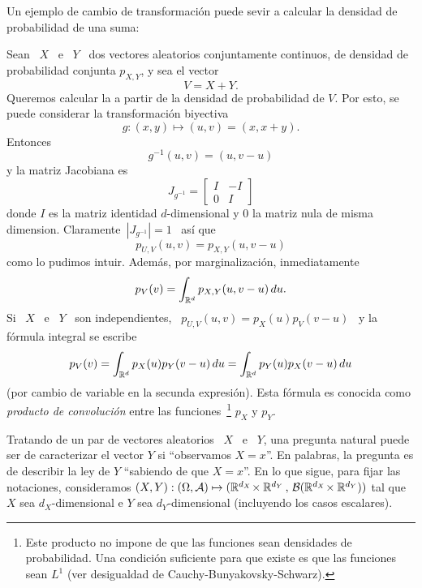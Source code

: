 Un ejemplo de  cambio de transformaci\'on puede sevir a  calcular la densidad de
probabilidad de una suma:
%
\begin{ejemplo}
\label{Ej:MP:Suma}
%
  Sean \  $X$ \ e  \ $Y$ \  dos vectores aleatorios conjuntamente  continuos, de
  densidad de  probabilidad conjunta $p_{X,Y}$,  y sea el  vector \[V = X  + Y.\]
  Queremos calcular la a partir de la densidad de probabilidad de $V$.  Por esto,
  se puede considerar la transformaci\'on biyectiva
  \[
  g: (x,y) \mapsto (u,v) = (x,x+y).
  \]
  Entonces
  \[
  g^{-1}(u,v) = (u,v-u)
  \]
  y la matriz Jacobiana es
  \[
  J_{g^{-1}} = \begin{bmatrix} I & -I \\ 0 & I \end{bmatrix}
  \]
  donde $I$ es la matriz identidad $d$-dimensional y $0$ la matriz nula de misma
  dimension. Claramente\ $\left| J_{g^{-1}} \right| = 1$ \ as\'i que
  \[
  p_{U,V}(u,v) = p_{X,Y}(u,v-u)
  \]
  como lo pudimos intuir. Adem\'as, por marginalizaci\'on, inmediatamente
  \[
  p_V(v) = \int_{\mathbb{R}^d} p_{X,Y}(u,v-u) \, du.
  \]
  Si \ $X$ \ e \ $Y$  \ son independientes, \ $p_{U,V}(u,v) = p_X(u) p_V(v-u)$ \
  y la f\'ormula integral se escribe
  \[
  p_V(v) = \int_{\mathbb{R}^d} p_X(u) p_Y(v-u) \, du = \int_{\mathbb{R}^d} p_Y(u) p_X(v-u)
  \, du
  \]
  (por  cambio  de variable  en  la  secunda  expresi\'on).  Esta  f\'ormula  es
  conocida    como     {\it    producto    de     convoluci\'on}    entre    las
  funciones~\footnote{Este  producto  no  impone   de  que  las  funciones  sean
    densidades de  probabilidad.  Una condici\'on suficiente para  que existe es
    que     las     funciones     sean     $L^1$     (ver     desigualdad     de
    Cauchy-Bunyakovsky-Schwarz).} $p_X$ y $p_Y$.
\end{ejemplo}





\label{Ssec:MP:LeyesCondicionales}

Tratando de un par de vectores aleatorios  \ $X$ \ e \ $Y$, una pregunta natural
puede ser de caracterizar el vector  $Y$ si ``observamos $X = x$''. En palabras,
la pregunta es de describir la ley de $Y$ ``sabiendo de que $X = x$''. En lo que
sigue, para  fijar las notaciones, consideramos  $(X,Y): ( \Omega  , \mathcal{A}) \mapsto
(\mathbb{R}^{d_X} \! \times \mathbb{R}^{d_Y} \, , \, \mathcal{B}(\mathbb{R}^{d_X} \! \times \mathbb{R}^{d_Y})
)$ tal que $X$ sea $d_X$-dimensional e $Y$ sea $d_Y$-dimensional (incluyendo los
casos escalares).


